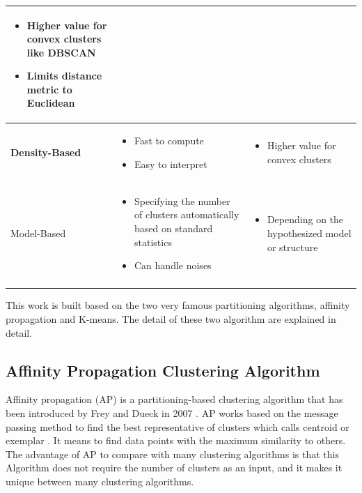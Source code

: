 \documentclass[../UNBThesis2.tex]{subfiles}
\begin{document}
\begin{table}[!h]
\begin{tabularx}{\linewidth}{p{3cm} p{5.5cm} p{5.5cm}}
\begin{itemize}[*,nosep,leftmargin=0.2cm]
    \item Higher value for convex clusters like DBSCAN
    \item Limits distance metric to Euclidean
\end{itemize}
\tabularnewline \hline
\vfill
 \textbf{Density-Based}
& 
\begin{itemize}[*,nosep,leftmargin=0.2cm]
    \item Fast to compute
    \item Easy to interpret %
\end{itemize}
 &       
\begin{itemize}[*,nosep,leftmargin=0.2cm]
    \item Higher value for convex clusters%
\end{itemize}
\tabularnewline \hline
\vfill
 Model-Based
& 
\begin{itemize}[*,nosep,leftmargin=0.2cm]
    \item Specifying the number of clusters automatically based on standard statistics 
    \item Can handle noises            
\end{itemize}
 &       
\begin{itemize}[*,nosep,leftmargin=0.2cm]
    \item Depending on the hypothesized model or structure
\end{itemize} 
\tabularnewline \hline
\vfill
\end{tabularx}
\end{table}





This work is built based on the two very famous partitioning algorithms, affinity propagation and K-means. The detail of these two algorithm are explained in detail.


\subsection{Affinity Propagation Clustering Algorithm}

Affinity propagation (AP) is a partitioning-based clustering algorithm that has been introduced by Frey and Dueck in 2007 \cite{frey2006mixture}. AP works based on the message passing method to find the best representative of clusters which calls centroid or exemplar \cite{jiang2019exemplar, frey2007clustering}. It means to find data points with the maximum similarity to others. The advantage of AP to compare with many clustering algorithms is that this Algorithm does not require the number of clusters as an input, and it makes it unique between many clustering algorithms.
\end{document}
